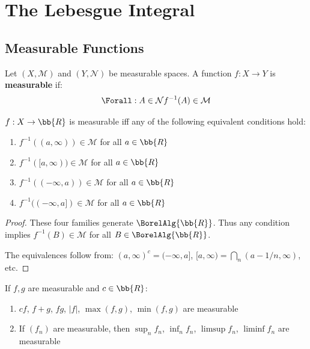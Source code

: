 \chapter{The Lebesgue Integral}

\section{Measurable Functions}

\begin{definition}
Let $(X, \mathcal{M})$ and $(Y, \mathcal{N})$ be measurable spaces. A function $f: X \to Y$ is \textbf{measurable} if:
\[ \Forall :{A \in \mathcal{N}}{f^{-1}(A) \in \mathcal{M}} \]
\end{definition}

\begin{proposition}
$f: X \to \bb{R}$ is measurable iff any of the following equivalent conditions hold:
\begin{enumerate}
    \item $f^{-1}((a, \infty)) \in \mathcal{M}$ for all $a \in \bb{R}$
    \item $f^{-1}([a, \infty)) \in \mathcal{M}$ for all $a \in \bb{R}$
    \item $f^{-1}((-\infty, a)) \in \mathcal{M}$ for all $a \in \bb{R}$
    \item $f^{-1}((-\infty, a]) \in \mathcal{M}$ for all $a \in \bb{R}$
\end{enumerate}
\end{proposition}

\begin{proof}
These four families generate $\BorelAlg{\bb{R}}$. Thus any condition implies $f^{-1}(B) \in \mathcal{M}$ for all $B \in \BorelAlg{\bb{R}}$.

The equivalences follow from: $(a, \infty)^c = (-\infty, a]$, $[a, \infty) = \bigcap_n (a - 1/n, \infty)$, etc.
\end{proof}

\begin{proposition}
If $f, g$ are measurable and $c \in \bb{R}$:
\begin{enumerate}
    \item $cf$, $f + g$, $fg$, $|f|$, $\max(f, g)$, $\min(f, g)$ are measurable
    \item If $(f_n)$ are measurable, then $\sup_n f_n$, $\inf_n f_n$, $\limsup f_n$, $\liminf f_n$ are measurable
\end{enumerate}
\end{proposition}

